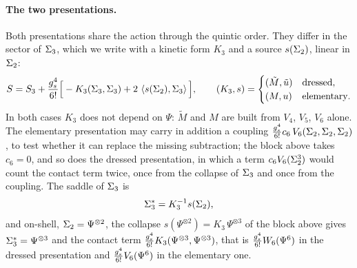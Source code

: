 \paragraph{The two presentations.}
Both presentations share the action through the quintic order.
They differ in the sector of $\Sigma_3$, which we write with a kinetic form $K_3$ and a source $s(\Sigma_2)$, linear in $\Sigma_2$:
\begin{equation}
  \label{eq:ch2:sext:both}
  S
    = S_3 + \frac{g_s^4}{6!} \Big[ - K_3(\Sigma_3, \Sigma_3) + 2 \, \left \langle s(\Sigma_2), \Sigma_3 \right \rangle \Big],
  \qquad
  (K_3, s)
    =
    \begin{cases}
      (\tilde M, \tilde u)
        & \text{dressed},
      \\
      (M, u)
        & \text{elementary}.
    \end{cases}
\end{equation}
In both cases $K_3$ does not depend on $\Psi$: $\tilde M$ and $M$ are built from $V_4$, $V_5$, $V_6$ alone.
The elementary presentation may carry in addition a coupling $\tfrac{g_s^4}{6!} c_6 \, V_6(\Sigma_2, \Sigma_2, \Sigma_2)$, to test whether it can replace the missing subtraction; the block above takes $c_6 = 0$, and so does the dressed presentation, in which a term $c_6 V_6(\Sigma_2^3)$ would count the contact term twice, once from the collapse of $\Sigma_3$ and once from the coupling.
The saddle of $\Sigma_3$ is
\begin{equation}
  \Sigma_3^*
    = K_3^{-1} s(\Sigma_2),
\end{equation}
and on-shell, $\Sigma_2 = \Psi^{\otimes 2}$, the collapse $s(\Psi^{\otimes 2}) = K_3 \, \Psi^{\otimes 3}$ of the block above gives $\Sigma_3^* = \Psi^{\otimes 3}$ and the contact term $\tfrac{g_s^4}{6!} K_3(\Psi^{\otimes 3}, \Psi^{\otimes 3})$, that is $\tfrac{g_s^4}{6!} W_6(\Psi^6)$ in the dressed presentation and $\tfrac{g_s^4}{6!} V_6(\Psi^6)$ in the elementary one.

